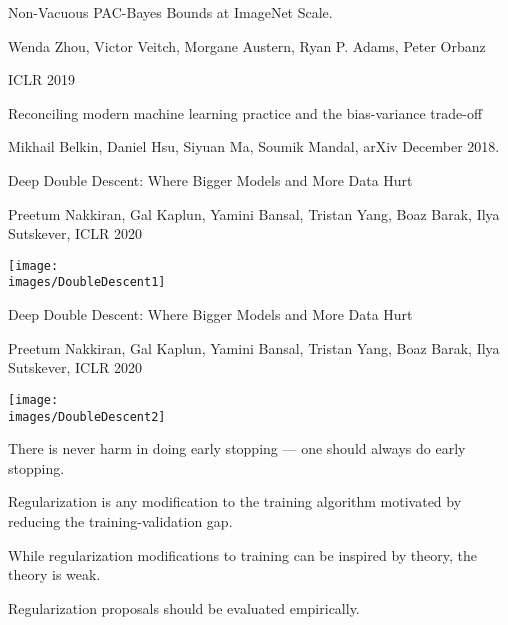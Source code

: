 {\vfill
Non-Vacuous PAC-Bayes Bounds at ImageNet Scale.

\bigskip
Wenda Zhou, Victor Veitch, Morgane Austern, Ryan P. Adams, Peter Orbanz

\bigskip
ICLR 2019


{\huge
Reconciling modern machine learning practice and the bias-variance trade-off

\bigskip
Mikhail Belkin, Daniel Hsu, Siyuan Ma, Soumik Mandal, arXiv December 2018.

\vfill
Deep Double Descent: Where Bigger Models and More Data Hurt

\bigskip
Preetum Nakkiran, Gal Kaplun, Yamini Bansal, Tristan Yang, Boaz Barak, Ilya Sutskever, ICLR 2020
}


\centerline{\texttt{[image: \\images/DoubleDescent1]}}

\vfill
Deep Double Descent: Where Bigger Models and More Data Hurt

\bigskip
Preetum Nakkiran, Gal Kaplun, Yamini Bansal, Tristan Yang, Boaz Barak, Ilya Sutskever, ICLR 2020


\centerline{\texttt{[image: \\images/DoubleDescent2]}}


There is never harm in doing early stopping --- one should always do early stopping.

\vfill
Regularization is any modification to the training algorithm motivated by reducing the training-validation gap.

\vfill
While regularization modifications to training can be inspired by theory, the theory is weak.

\vfill
Regularization proposals should be evaluated empirically.



}

